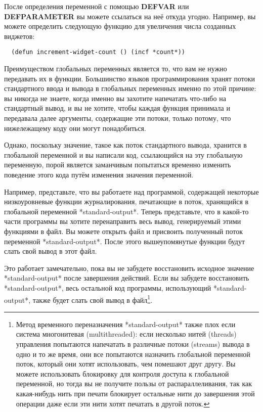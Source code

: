 После определения переменной с помощью \textbf{DEFVAR} или \textbf{DEFPARAMETER} вы можете
ссылаться на неё откуда угодно. Например, вы можете определить следующую функцию для
увеличения числа созданных виджетов:

\begin{lstlisting}
  (defun increment-widget-count () (incf *count*))
\end{lstlisting}

Преимуществом глобальных переменных является то, что вам не нужно передавать их в
функции. Большинство языков программирования хранят потоки стандартного ввода и вывода в
глобальных переменных именно по этой причине: вы никогда не знаете, когда именно вы
захотите напечатать что-либо на стандартный вывод, и вы не хотите, чтобы каждая функция
принимала и передавала далее аргументы, содержащие эти потоки, только потому, что
нижележащему коду они могут понадобиться.

Однако, поскольку значение, такое как поток стандартного вывода, хранится в глобальной переменной и вы написали код, ссылающийся на эту глобальную переменную, порой является заманчивым попытаться временно изменить поведение этого кода путём изменения значения переменной.

Например, представьте, что вы работаете над программой, содержащей некоторые
низкоуровневые функции журналирования, печатающие в поток, хранящийся в глобальной
переменной *standard-output*. Теперь представьте, что в какой-то части программы вы хотите
перенаправить весь вывод, генерируемый этими функциями в файл. Вы можете открыть файл и
присвоить полученный поток переменной *standard-output*. После этого вышеупомянутые
функции будут слать свой вывод в этот файл.

Это работает замечательно, пока вы не забудете восстановить исходное значение
*standard-output* после завершения действий. Если вы забудете восстановить
*standard-output*, весь остальной код программы, использующий *standard-output*, также
будет слать свой вывод в файл\footnote{Метод временного переназначения *standard-output*
  также плох если система многонитевая (multithreaded): если несколько нитей (threads)
  управления попытаются напечатать в различные потоки (streams) вывода в одно и то же
  время, они все попытаются назначить глобальной переменной поток, который они хотят
  использовать, чем помешают друг другу. Вы можете использовать блокировку для контроля
  доступа к глобальной переменной, но тогда вы не получите пользы от распараллеливания,
  так как какая-нибудь нить при печати блокирует остальные нити до завершения этой
  операции даже если эти нити хотят печатать в другой поток.}.

